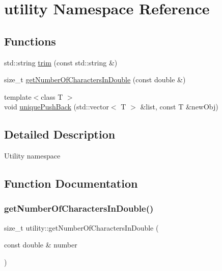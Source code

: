 \hypertarget{namespaceutility}{}\section{utility Namespace Reference}
\label{namespaceutility}
\subsection*{Functions}
\begin{DoxyCompactItemize}
\item 
std\+::string \hyperlink{namespaceutility_a4b1e0a26a1bf269307ee7e7aade748d7}{trim} (const std\+::string \&)
\item 
size\+\_\+t \hyperlink{namespaceutility_a3bcb80ec0fdb646da8b89b7c72544004}{get\+Number\+Of\+Characters\+In\+Double} (const double \&)
\item 
{\footnotesize template$<$class T $>$ }\\void \hyperlink{namespaceutility_a45e13892473966da52a2e701a4af9f63}{unique\+Push\+Back} (std\+::vector$<$ T $>$ \&list, const T \&new\+Obj)
\end{DoxyCompactItemize}


\subsection{Detailed Description}
Utility namespace 

\subsection{Function Documentation}
\mbox{\label{namespaceutility_a3bcb80ec0fdb646da8b89b7c72544004}} 
\subsubsection{\texorpdfstring{get\+Number\+Of\+Characters\+In\+Double()}{getNumberOfCharactersInDouble()}}
{\footnotesize\ttfamily size\+\_\+t utility\+::get\+Number\+Of\+Characters\+In\+Double (\begin{DoxyParamCaption}\item[{const double \&}]{number }\end{DoxyParamCaption})}

